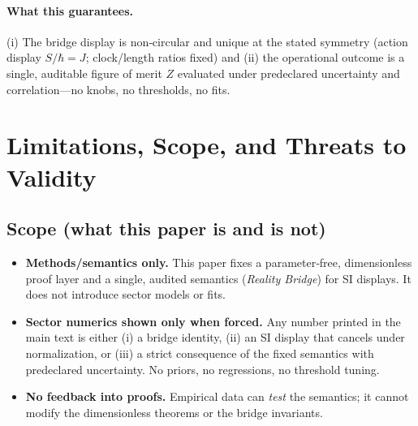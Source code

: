 \documentclass[11pt]{article}
\begin{document}
\paragraph{What this guarantees.}
(i) The bridge display is non‑circular and unique at the stated symmetry (action display \(S/\hbar=J\); clock/length ratios fixed) and (ii) the operational outcome is a single, auditable figure of merit \(Z\) evaluated under predeclared uncertainty and correlation—no knobs, no thresholds, no fits.

\section{Limitations, Scope, and Threats to Validity}
\label{sec:limits-scope-threats}

\subsection*{Scope (what this paper is and is not)}
\begin{itemize}
  \item \textbf{Methods/semantics only.} This paper fixes a parameter‑free, dimensionless proof layer and a single, audited semantics (\emph{Reality Bridge}) for SI displays. It does not introduce sector models or fits.
  \item \textbf{Sector numerics shown only when forced.} Any number printed in the main text is either (i) a bridge identity, (ii) an SI display that cancels under normalization, or (iii) a strict consequence of the fixed semantics with predeclared uncertainty. No priors, no regressions, no threshold tuning.
  \item \textbf{No feedback into proofs.} Empirical data can \emph{test} the semantics; it cannot modify the dimensionless theorems or the bridge invariants.
\end{itemize}
\end{document}
